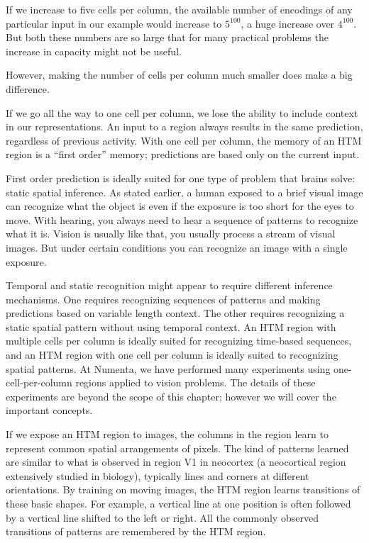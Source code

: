 \documentclass{report}
\begin{document}
If we increase to five cells per column, the available number of
encodings of any particular input in our example would increase to
$5^{100}$, a huge increase over $4^{100}$. But both these numbers are
so large that for many practical problems the increase in capacity
might not be useful.

However, making the number of cells per column much smaller does make
a big difference.

If we go all the way to one cell per column, we lose the ability to
include context in our representations. An input to a region always
results in the same prediction, regardless of previous activity. With
one cell per column, the memory of an HTM region is a ``first order''
memory; predictions are based only on the current input.

First order prediction is ideally suited for one type of problem that
brains solve: static spatial inference. As stated earlier, a human
exposed to a brief visual image can recognize what the object is even
if the exposure is too short for the eyes to move. With hearing, you
always need to hear a sequence of patterns to recognize what it
is. Vision is usually like that, you usually process a stream of
visual images. But under certain conditions you can recognize an image
with a single exposure.

Temporal and static recognition might appear to require different
inference mechanisms. One requires recognizing sequences of patterns
and making predictions based on variable length context. The other
requires recognizing a static spatial pattern without using temporal
context. An HTM region with multiple cells per column is ideally
suited for recognizing time-based sequences, and an HTM region with
one cell per column is ideally suited to recognizing spatial
patterns. At Numenta, we have performed many experiments using
one-cell-per-column regions applied to vision problems. The details of
these experiments are beyond the scope of this chapter; however we
will cover the important concepts.

If we expose an HTM region to images, the columns in the region learn
to represent common spatial arrangements of pixels. The kind of
patterns learned are similar to what is observed in region V1 in
neocortex (a neocortical region extensively studied in biology),
typically lines and corners at different orientations. By training on
moving images, the HTM region learns transitions of these basic
shapes. For example, a vertical line at one position is often followed
by a vertical line shifted to the left or right. All the commonly
observed transitions of patterns are remembered by the HTM region.
\end{document}
